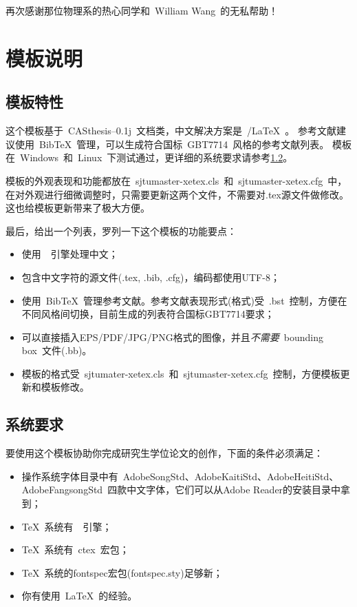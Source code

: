 再次感谢那位物理系的热心同学和~William Wang~的无私帮助！

\section{模板说明}
\label{sec:fastguide}

\subsection{模板特性}
\label{sec:features}

这个模板基于~CASthesis--0.1j~文档类，中文解决方案是~\XeTeX/\LaTeX~。
参考文献建议使用~BibTeX~管理，可以生成符合国标~GBT7714~风格的参考文献列表。
模板在~Windows~和~Linux~下测试通过，更详细的系统要求请参考\ref{sec:requirements}。

模板的外观表现和功能都放在~sjtumaster-xetex.cls~和~sjtumaster-xetex.cfg~中，在对外观进行细微调整时，只需要更新这两个文件，不需要对.tex源文件做修改。
这也给模板更新带来了极大方便。

最后，给出一个列表，罗列一下这个模板的功能要点：

\begin{itemize}
\item 使用~\XeTeX~引擎处理中文；
\item 包含中文字符的源文件(.tex, .bib, .cfg)，编码都使用UTF-8；
\item 使用~BibTeX~管理参考文献。参考文献表现形式(格式)受~.bst~控制，方便在不同风格间切换，目前生成的列表符合国标GBT7714要求；
\item 可以直接插入EPS/PDF/JPG/PNG格式的图像，并且\emph{不需要}~bounding box~文件(.bb)。
\item 模板的格式受~sjtumater-xetex.cls~和~sjtumaster-xetex.cfg~控制，方便模板更新和模板修改。
\end{itemize}

\subsection{系统要求}
\label{sec:requirements}

要使用这个模板协助你完成研究生学位论文的创作，下面的条件必须满足：

\begin{itemize}
\item 操作系统字体目录中有~AdobeSongStd、AdobeKaitiStd、AdobeHeitiStd、AdobeFangsongStd~四款中文字体，它们可以从Adobe Reader的安装目录中拿到；
\item \TeX~系统有~\XeTeX~引擎；
\item \TeX~系统有~ctex~宏包；
\item \TeX~系统的fontspec宏包(fontspec.sty)足够新；
\item 你有使用~\LaTeX~的经验。
\end{itemize}

